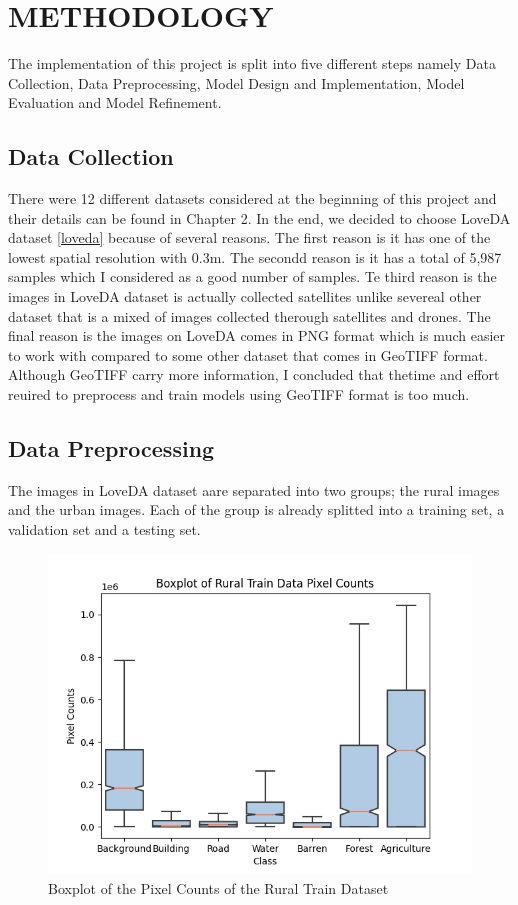 \chapter{METHODOLOGY}

The implementation of this project is split into five different steps namely Data Collection, Data Preprocessing, Model Design and Implementation, Model Evaluation and Model Refinement.

\section{Data Collection}

There were 12 different datasets considered at the beginning of this project and their details can be found in Chapter 2. In the end, we decided to choose LoveDA dataset \ref{loveda} because of several reasons. The first reason is it has one of the lowest spatial resolution with 0.3m. The secondd reason is it has a total of 5,987 samples which I considered as a good number of samples. Te third reason is the images in LoveDA dataset is actually collected satellites unlike severeal other dataset that is a mixed of images collected therough satellites and drones. The final reason is the images on LoveDA comes in PNG format which is much easier to work with compared to some other dataset that comes in GeoTIFF format. Although GeoTIFF carry more information, I concluded that thetime and effort reuired to preprocess and train models using GeoTIFF format is too much.

\section{Data Preprocessing}

The images in LoveDA dataset aare separated into two groups; the rural images and the urban images. Each of the group is already splitted into a training set, a validation set and a testing set.

\FloatBarrier
\begin{figure}[!h]
\includegraphics[width=15.0cm, height=8.5cm]{images/rural train boxplot.png}
\centering
\caption{Boxplot of the Pixel Counts of the Rural Train Dataset}
\label{fig:boxplot-rural-train}
\end{figure}

